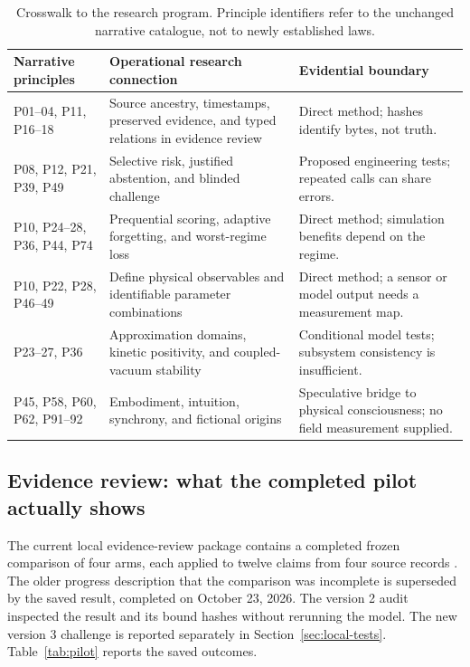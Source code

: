 \begin{table}[htbp]
\centering\small
\begin{tabular}{@{}>{\raggedright\arraybackslash}p{.22\linewidth}>{\raggedright\arraybackslash}p{.37\linewidth}>{\raggedright\arraybackslash}p{.34\linewidth}@{}}
\toprule
Narrative principles & Operational research connection & Evidential boundary\\\midrule
P01--04, P11, P16--18 & Source ancestry, timestamps, preserved evidence, and typed relations in evidence review & Direct method; hashes identify bytes, not truth.\\
P08, P12, P21, P39, P49 & Selective risk, justified abstention, and blinded challenge & Proposed engineering tests; repeated calls can share errors.\\
P10, P24--28, P36, P44, P74 & Prequential scoring, adaptive forgetting, and worst-regime loss & Direct method; simulation benefits depend on the regime.\\
P10, P22, P28, P46--49 & Define physical observables and identifiable parameter combinations & Direct method; a sensor or model output needs a measurement map.\\
P23--27, P36 & Approximation domains, kinetic positivity, and coupled-vacuum stability & Conditional model tests; subsystem consistency is insufficient.\\
P45, P58, P60, P62, P91--92 & Embodiment, intuition, synchrony, and fictional origins & Speculative bridge to physical consciousness; no field measurement supplied.\\\bottomrule
\end{tabular}
\caption{Crosswalk to the research program. Principle identifiers refer to the unchanged narrative catalogue, not to newly established laws.}
\end{table}

\subsection{Evidence review: what the completed pilot actually shows}
The current local evidence-review package contains a completed frozen comparison of four arms, each applied to twelve claims from four source records \cite{pilot}. The older progress description that the comparison was incomplete is superseded by the saved result, completed on October 23, 2026. The version 2 audit inspected the result and its bound hashes without rerunning the model. The new version 3 challenge is reported separately in Section~\ref{sec:local-tests}. Table~\ref{tab:pilot} reports the saved outcomes.

